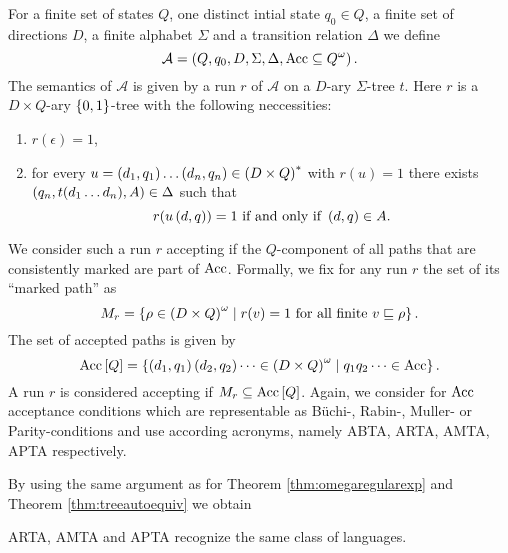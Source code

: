 \begin{definition}
  For a finite set of states $Q$, one distinct intial state $q_{0}\in Q$, a
  finite set of directions $D$, a finite alphabet $\Sigma$ and a transition
  relation $\Delta$ we define 
  \begin{equation*}
    \mathcal{A} = \left(Q, q_{0}, D, \Sigma, \Delta, \operatorname{Acc}\subseteq Q^{\omega}\right).
  \end{equation*}
  The semantics of $\mathcal{A}$ is given by a run $r$ of $\mathcal{A}$ on a
  $D$-ary $\Sigma$-tree $t$. Here $r$ is a $D\times Q$-ary $\left\{0,1\right\}$-tree 
  with the following neccessities:
  \begin{enumerate}
    \item $r(\epsilon) = 1$,
    \item for every $u = \left(d_{1}, q_{1}\right)\dots\left(d_{n}, q_{n}\right)\in
      \left(D\times Q\right)^{*}$ with $r(u) = 1$ there exists
      $\left(q_{n}, t(d_{1}\dots d_{n}), A\right)\in\Delta$ such that
      \begin{equation*}
        r(u\left(d, q\right)) = 1\text{ if and only if }\left(d, q\right)\in A.
      \end{equation*}
  \end{enumerate}
  We consider such a run $r$ accepting if the $Q$-component of all paths that 
  are consistently marked are part of $\operatorname{Acc}$. Formally, we fix for any run $r$ 
  the set of its \enquote{marked path} as
  \begin{equation*}
    M_{r} = \left\{
      \rho\in\left(D\times Q\right)^{\omega}\mid r(v) = 1\text{ for all finite }
        v\sqsubseteq\rho
    \right\}.
  \end{equation*}
  The set of accepted paths is given by
  \begin{equation*}
    \operatorname{Acc}\left[Q\right] = \left\{
      \left(d_{1}, q_{1}\right)\left(d_{2}, q_{2}\right)\dots\in
      \left(D\times Q\right)^{\omega}\mid q_{1}q_{2}\dots\in\operatorname{Acc}
    \right\}.
  \end{equation*}
  A run $r$ is considered accepting if $M_{r}\subseteq\operatorname{Acc}\left[Q\right]$.
  Again, we consider for $\operatorname{Acc}$ acceptance conditions which are representable
  as Büchi-, Rabin-, Muller- or Parity-conditions and use according acronyms,
  namely \acs{ABTA}, \acs{ARTA}, \acs{AMTA}, \acs{APTA} respectively.
      
\end{definition}
By using the same argument as for Theorem 
\ref{thm:omegaregularexp} and Theorem \ref{thm:treeautoequiv} we obtain
\begin{theorem}
  \ac{ARTA}, \ac{AMTA} and \ac{APTA} recognize the same class of languages.
  \label{thm:atreeautoequiv}
\end{theorem}
